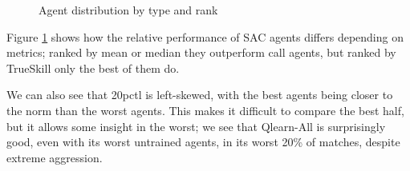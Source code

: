 \begin{figure}[H]
{}
\caption{Agent distribution by type and rank}
\label{AgentTypeDistribution}
\end{figure}

Figure \ref{AgentTypeDistribution} shows how the relative performance of SAC agents differs depending on metrics; ranked by mean or median they outperform call agents, but ranked by TrueSkill only the best of them do.

We can also see that 20pctl is left-skewed, with the best agents being closer to the norm than the worst agents. This makes it difficult to compare the best half, but it allows some insight in the worst; we see that Qlearn-All is surprisingly good, even with its worst untrained agents, in its worst 20\% of matches, despite extreme aggression.


